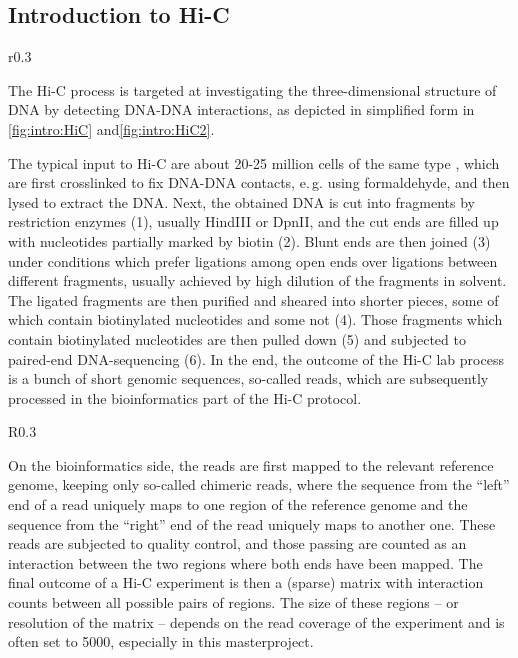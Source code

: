 \subsection{Introduction to Hi-C} \label{sec:intro:hic}
\begin{wrapfigure}[19]{r}{0.3\textwidth}
 \caption{Hi-C lab process}
 \label{fig:intro:HiC}
\end{wrapfigure}
The Hi-C process is targeted at investigating the three-dimensional structure of DNA
by detecting DNA-DNA interactions, 
as depicted in simplified form in \autoref{fig:intro:HiC} and\;\ref{fig:intro:HiC2}.

The typical input to Hi-C are about 20-25 million cells of the same type \cite{Berkum2010},
which are first crosslinked to fix DNA-DNA contacts, e.\,g. using formaldehyde, 
and then lysed to extract the DNA.
Next, the obtained DNA is cut into fragments by restriction enzymes (1),
usually HindIII or DpnII, 
and the cut ends are filled up with nucleotides partially marked by biotin (2).
Blunt ends are then joined (3) under conditions which prefer
ligations among open ends over ligations between different fragments,
usually achieved by high dilution of the fragments in solvent.
The ligated fragments are then purified and sheared into shorter pieces,
some of which contain biotinylated nucleotides and some not (4).
Those fragments which contain biotinylated nucleotides 
are then pulled down (5) and subjected to paired-end DNA-sequencing (6).
In the end, the outcome of the Hi-C lab process is a bunch of short genomic sequences, so-called reads,
which are subsequently processed in the bioinformatics part of the Hi-C protocol.
\bgroup
\setlength{\intextsep}{0cm}
\begin{wrapfigure}[17]{R}{0.3\textwidth}
 \caption{Hi-C lab process (cont.)}
 \label{fig:intro:HiC2}
\end{wrapfigure}
\egroup

On the bioinformatics side, the reads are first mapped to the relevant reference genome,
keeping only so-called chimeric reads, where the sequence from the ``left'' end of a read
uniquely maps to one region of the reference genome and the sequence from the ``right'' end 
of the read uniquely maps to another one.
These reads are subjected to quality control, and those passing are counted as an interaction
between the two regions where both ends have been mapped.
The final outcome of a Hi-C experiment is then a (sparse) matrix with interaction counts 
between all possible pairs of regions.
The size of these regions -- or resolution of the matrix -- depends on the read coverage
of the experiment and is often set to \SI{5000}{\bp}, especially in this masterproject.

